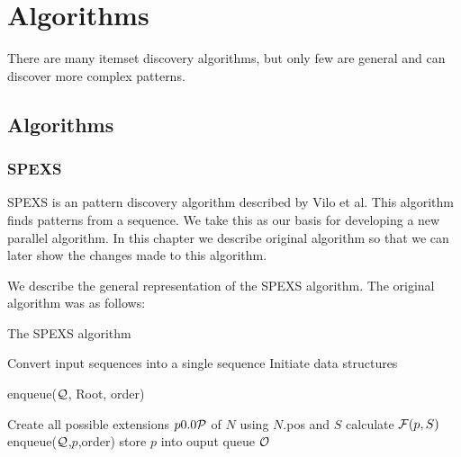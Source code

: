 \chapter{Algorithms}

There are many itemset discovery algorithms, but only few are general and 
can discover more complex patterns. 

\section{Algorithms}

\subsection{SPEXS}

SPEXS is an pattern discovery algorithm described by Vilo et al. \cite{spexs}
This algorithm finds patterns from a sequence. We take this as our basis for developing a new parallel algorithm. In this chapter we describe original algorithm so that we can later show the changes made to this algorithm.

We describe the general representation of the SPEXS algorithm. 
The original algorithm was as follows:


\begin{algorithm}[H]
	\caption{The SPEXS algorithm}
\begin{algorithmic}[1]

	\State Convert input sequences into a single sequence
	\State Initiate data structures

	\State enqueue($\mathcal{Q}$, Root, order)

		\State Create all possible extensions $p \in \sym{P}$ of $N$ using $N$.pos and $S$
				\State calculate $\mathcal{F}(p,S)$
				\State enqueue($\mathcal{Q}$,$p$,order)
					\State store $p$ into ouput queue $\mathcal{O}$
				\EndIf
			\EndIf
		\EndFor
	\EndWhile
\end{algorithmic}
\end{algorithm}

